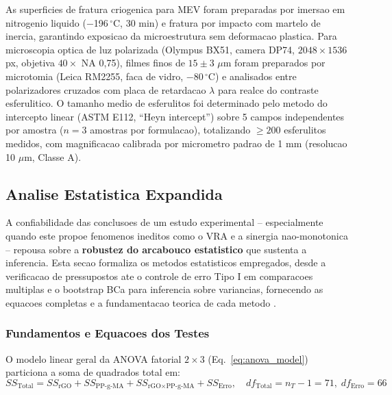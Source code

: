\documentclass[11pt,a4paper,oneside]{article}
\begin{document}
As superficies de fratura criogenica para MEV foram preparadas por imersao em nitrogenio liquido
($-$196$\,^{\circ}$C, 30 min) e fratura por impacto com martelo de inercia, garantindo exposicao
da microestrutura sem deformacao plastica. Para microscopia optica de luz polarizada (Olympus
BX51, camera DP74, $2048{\times}1536$ px, objetiva $40{\times}$ NA 0,75), filmes finos de
$15{\pm}3$ $\mu$m foram preparados por microtomia (Leica RM2255, faca de vidro, $-$80$\,^{\circ}$C)
e analisados entre polarizadores cruzados com placa de retardacao $\lambda$ para realce do
contraste esferulitico. O tamanho medio de esferulitos foi determinado pelo metodo do intercepto
linear (ASTM E112, ``Heyn intercept'') sobre 5 campos independentes por amostra ($n{=}3$ amostras
por formulacao), totalizando ${\ge}200$ esferulitos medidos, com magnificacao calibrada por
micrometro padrao de 1 mm (resolucao 10 $\mu$m, Classe A).

\subsection{Analise Estatistica Expandida}\label{sec:estat_expandida}

A confiabilidade das conclusoes de um estudo experimental -- especialmente quando este propoe
fenomenos ineditos como o VRA e a sinergia nao-monotonica -- repousa sobre a {\bfseries robustez
do arcabouco estatistico} que sustenta a inferencia. Esta secao formaliza os metodos estatisticos
empregados, desde a verificacao de pressupostos ate o controle de erro Tipo I em comparacoes
multiplas e o bootstrap BCa para inferencia sobre variancias, fornecendo as equacoes completas e
a fundamentacao teorica de cada metodo \cite{Cohen1988, Montgomery2020}.

\subsubsection{Fundamentos e Equacoes dos Testes}

O modelo linear geral da ANOVA fatorial $2{\times}3$ (Eq.~\ref{eq:anova_model}) particiona a
soma de quadrados total em:
\begin{equation}
SS_{\text{Total}} = SS_{\text{rGO}} + SS_{\text{PP-g-MA}} + SS_{\text{rGO}\times\text{PP-g-MA}} + SS_{\text{Erro}},\quad df_{\text{Total}}{=}n_T{-}1{=}71,\; df_{\text{Erro}}{=}66
\label{eq:anova_ss}
\end{equation}
\end{document}
